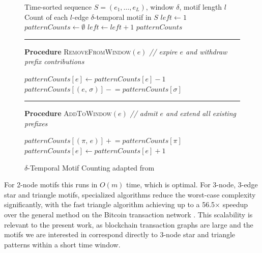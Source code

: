 \begin{figure}[t]
\begin{minipage}{\linewidth}

\begin{algorithm}[H]
\caption{$\delta$-Temporal Motif Counting adapted from \citet{paranjape2017motifs}}
\label{alg:paranjape}
\begin{algorithmic}[1]
\Require Time-sorted sequence $S = (e_1, \ldots, e_L)$,
         window $\delta$, motif length $l$
\Ensure Count of each $l$-edge $\delta$-temporal motif in $S$
\State $\textit{left} \gets 1$
\State $\textit{patternCounts} \gets \emptyset$
        \State {}
        \State $\textit{left} \gets \textit{left} + 1$
    \EndWhile
    \State {}
\EndFor
\State \Return $\textit{patternCounts}$
\end{algorithmic}

\noindent\rule{\linewidth}{0.4pt}
\noindent\textbf{Procedure} \textsc{RemoveFromWindow}$(e)$
\hfill\textit{// expire $e$ and withdraw prefix contributions}
\begin{algorithmic}[1]
\State $\textit{patternCounts}[e] \gets \textit{patternCounts}[e] - 1$
    \State $\textit{patternCounts}[(e,\,\sigma)]
           \mathrel{-}= \textit{patternCounts}[\sigma]$
\EndFor
\end{algorithmic}

\noindent\rule{\linewidth}{0.4pt}
\noindent\textbf{Procedure} \textsc{AddToWindow}$(e)$
\hfill\textit{// admit $e$ and extend all existing prefixes}
\begin{algorithmic}[1]
    \State $\textit{patternCounts}[(\pi,\,e)]
           \mathrel{+}= \textit{patternCounts}[\pi]$
\EndFor
\State $\textit{patternCounts}[e] \gets \textit{patternCounts}[e] + 1$
\end{algorithmic}

\end{algorithm}
\end{minipage}
\end{figure}
 
For 2-node motifs this runs in 
$O(m)$ time, which is optimal. For 3-node, 3-edge star and triangle motifs, specialized algorithms reduce the worst-case complexity significantly, with the fast triangle algorithm achieving up to a 56.5$\times$ speedup over the general method on the Bitcoin transaction network \citep{paranjape2017motifs}. This scalability is relevant to the present work, as blockchain transaction graphs are large and the motifs we are interested in correspond directly to 3-node star and triangle patterns within a short time window.

